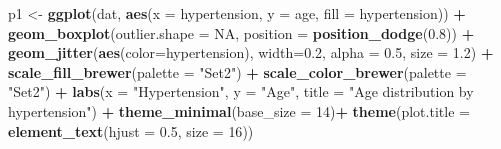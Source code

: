 \documentclass[
]{article}
\newenvironment{Shaded}{\begin{snugshade}}{\end{snugshade}}
\newcommand{\AttributeTok}[1]{\textcolor[rgb]{0.13,0.29,0.53}{#1}}
\newcommand{\ConstantTok}[1]{\textcolor[rgb]{0.56,0.35,0.01}{#1}}
\newcommand{\DecValTok}[1]{\textcolor[rgb]{0.00,0.00,0.81}{#1}}
\newcommand{\FloatTok}[1]{\textcolor[rgb]{0.00,0.00,0.81}{#1}}
\newcommand{\FunctionTok}[1]{\textcolor[rgb]{0.13,0.29,0.53}{\textbf{#1}}}
\newcommand{\NormalTok}[1]{#1}
\newcommand{\OtherTok}[1]{\textcolor[rgb]{0.56,0.35,0.01}{#1}}
\newcommand{\SpecialCharTok}[1]{\textcolor[rgb]{0.81,0.36,0.00}{\textbf{#1}}}
\newcommand{\StringTok}[1]{\textcolor[rgb]{0.31,0.60,0.02}{#1}}
\begin{document}
\begin{Shaded}
\begin{Highlighting}[]
\NormalTok{p1 }\OtherTok{\textless{}{-}} \FunctionTok{ggplot}\NormalTok{(dat, }\FunctionTok{aes}\NormalTok{(}\AttributeTok{x =}\NormalTok{ hypertension, }\AttributeTok{y =}\NormalTok{ age, }\AttributeTok{fill =}\NormalTok{ hypertension)) }\SpecialCharTok{+} 
      \FunctionTok{geom\_boxplot}\NormalTok{(}\AttributeTok{outlier.shape =} \ConstantTok{NA}\NormalTok{, }\AttributeTok{position =} \FunctionTok{position\_dodge}\NormalTok{(}\FloatTok{0.8}\NormalTok{)) }\SpecialCharTok{+}
      \FunctionTok{geom\_jitter}\NormalTok{(}\FunctionTok{aes}\NormalTok{(}\AttributeTok{color=}\NormalTok{hypertension), }\AttributeTok{width=}\FloatTok{0.2}\NormalTok{, }\AttributeTok{alpha =} \FloatTok{0.5}\NormalTok{, }\AttributeTok{size =} \FloatTok{1.2}\NormalTok{) }\SpecialCharTok{+}
      \FunctionTok{scale\_fill\_brewer}\NormalTok{(}\AttributeTok{palette =} \StringTok{"Set2"}\NormalTok{) }\SpecialCharTok{+}
      \FunctionTok{scale\_color\_brewer}\NormalTok{(}\AttributeTok{palette =} \StringTok{"Set2"}\NormalTok{) }\SpecialCharTok{+}
      \FunctionTok{labs}\NormalTok{(}\AttributeTok{x =} \StringTok{"Hypertension"}\NormalTok{, }\AttributeTok{y =} \StringTok{"Age"}\NormalTok{, }\AttributeTok{title =} \StringTok{"Age distribution by hypertension"}\NormalTok{) }\SpecialCharTok{+}
      \FunctionTok{theme\_minimal}\NormalTok{(}\AttributeTok{base\_size =} \DecValTok{14}\NormalTok{)}\SpecialCharTok{+}
      \FunctionTok{theme}\NormalTok{(}\AttributeTok{plot.title =} \FunctionTok{element\_text}\NormalTok{(}\AttributeTok{hjust =} \FloatTok{0.5}\NormalTok{, }\AttributeTok{size =} \DecValTok{16}\NormalTok{))}



\end{Highlighting}
\end{Shaded}
\end{document}
